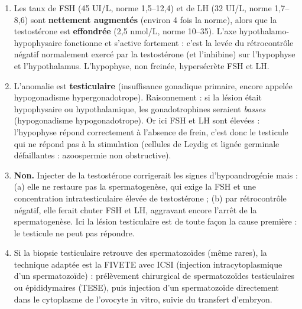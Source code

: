 \documentclass[11pt]{article}
\newcommand{\cle}[1]{{\popxbold\color{popdark}#1}}
\begin{document}
\begin{corrige}
\begin{enumerate}
    \item Les taux de FSH (45 UI/L, norme 1,5--12,4) et de LH (32 UI/L, norme 1,7--8,6) sont \textbf{nettement augmentés} (environ 4 fois la norme), alors que la testostérone est \textbf{effondrée} (2,5 nmol/L, norme 10--35). L'axe hypothalamo-hypophysaire fonctionne et s'active fortement : c'est la levée du \cle{rétrocontrôle négatif} normalement exercé par la testostérone (et l'inhibine) sur l'hypophyse et l'hypothalamus. L'hypophyse, non freinée, hypersécrète FSH et LH.
    \item L'anomalie est \textbf{testiculaire} (insuffisance gonadique primaire, encore appelée \cle{hypogonadisme hypergonadotrope}). Raisonnement : si la lésion était hypophysaire ou hypothalamique, les gonadotrophines seraient \emph{basses} (hypogonadisme hypogonadotrope). Or ici FSH et LH sont élevées : l'hypophyse répond correctement à l'absence de frein, c'est donc le testicule qui ne répond pas à la stimulation (cellules de Leydig et lignée germinale défaillantes : azoospermie non obstructive).
    \item \textbf{Non.} Injecter de la testostérone corrigerait les signes d'hypoandrogénie mais : (a) elle ne restaure pas la spermatogenèse, qui exige la FSH et une concentration intratesticulaire élevée de testostérone ; (b) par rétrocontrôle négatif, elle ferait chuter FSH et LH, aggravant encore l'arrêt de la spermatogenèse. Ici la lésion testiculaire est de toute façon la cause première : le testicule ne peut pas répondre.
    \item Si la biopsie testiculaire retrouve des spermatozoïdes (même rares), la technique adaptée est la \cle{FIVETE avec ICSI} (injection intracytoplasmique d'un spermatozoïde) : prélèvement chirurgical de spermatozoïdes testiculaires ou épididymaires (TESE), puis injection d'un spermatozoïde directement dans le cytoplasme de l'ovocyte in vitro, suivie du transfert d'embryon.
\end{enumerate}
\end{corrige}
\end{document}
